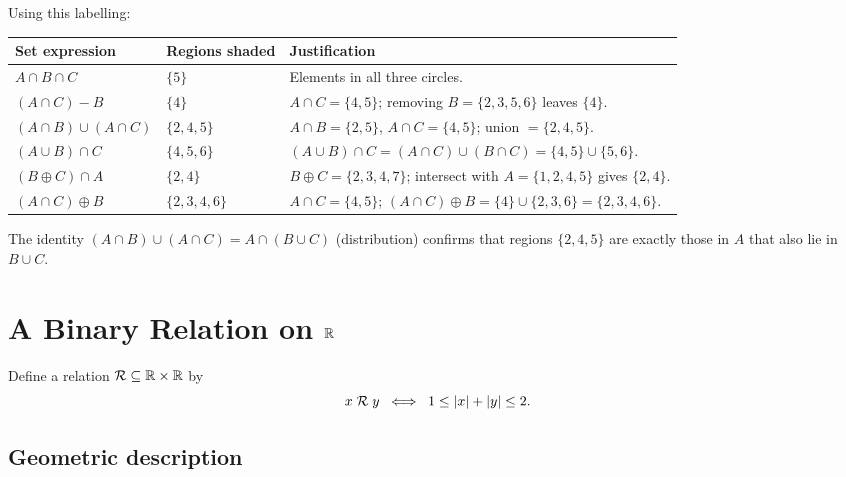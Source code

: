 Using this labelling:
\begin{center}
\renewcommand{\arraystretch}{1.3}
\begin{tabular}{lll}
    \hline
    \textbf{Set expression} & \textbf{Regions shaded} & \textbf{Justification} \\
    \hline
    $A \cap B \cap C$
        & $\{5\}$
        & Elements in all three circles. \\[2pt]
    $(A \cap C) - B$
        & $\{4\}$
        & $A\cap C = \{4,5\}$; removing $B = \{2,3,5,6\}$ leaves $\{4\}$. \\[2pt]
    $(A \cap B) \cup (A \cap C)$
        & $\{2,4,5\}$
        & $A\cap B=\{2,5\}$, $A\cap C=\{4,5\}$; union $= \{2,4,5\}$. \\[2pt]
    $(A \cup B) \cap C$
        & $\{4,5,6\}$
        & $(A\cup B)\cap C=(A\cap C)\cup(B\cap C)=\{4,5\}\cup\{5,6\}$. \\[2pt]
    $(B \oplus C) \cap A$
        & $\{2,4\}$
        & $B\oplus C=\{2,3,4,7\}$; intersect with $A=\{1,2,4,5\}$ gives $\{2,4\}$. \\[2pt]
    $(A \cap C) \oplus B$
        & $\{2,3,4,6\}$
        & $A\cap C=\{4,5\}$; $(A\cap C)\oplus B=\{4\}\cup\{2,3,6\}=\{2,3,4,6\}$. \\[2pt]
    \hline
\end{tabular}
\end{center}

\begin{remark}
The identity $(A\cap B)\cup(A\cap C) = A\cap(B\cup C)$ (distribution) confirms
that regions $\{2,4,5\}$ are exactly those in $A$ that also lie in $B\cup C$.
\end{remark}

\section{A Binary Relation on \texorpdfstring{$\mathbb{R}$}{R}}

\begin{definition}
Define a relation $\mathcal{R} \subseteq \mathbb{R} \times \mathbb{R}$ by
\[
    x \;\mathcal{R}\; y \;\iff\; 1 \leq |x| + |y| \leq 2.
\]
\end{definition}

\subsection{Geometric description}

